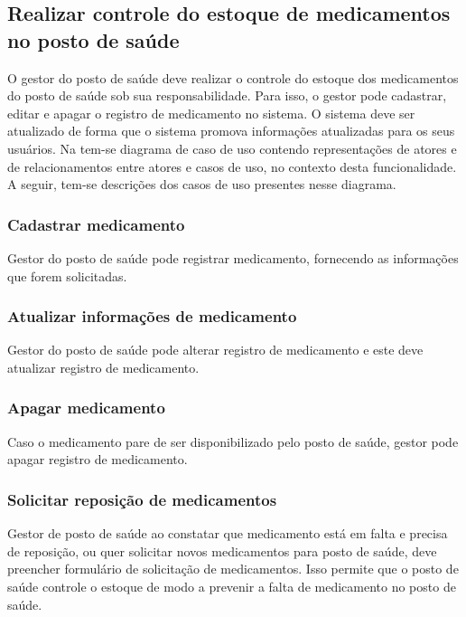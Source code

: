 %


\subsection{Realizar controle do estoque de medicamentos no posto de saúde}

O gestor do posto de saúde deve realizar o controle do estoque dos medicamentos do posto de saúde sob sua responsabilidade. Para isso, o gestor pode cadastrar, editar e apagar o registro de medicamento no sistema. O sistema deve ser atualizado de forma que o sistema promova informações atualizadas para os seus usuários. Na  tem-se diagrama de caso de uso contendo representações de atores e de relacionamentos entre atores e casos de uso, no contexto desta funcionalidade. A seguir, tem-se descrições dos casos de uso presentes nesse diagrama.


\subsubsection{Cadastrar medicamento}

Gestor do posto de saúde pode registrar medicamento, fornecendo as informações que forem solicitadas.

\subsubsection{Atualizar informações de medicamento}

Gestor do posto de saúde pode alterar registro de medicamento e este deve atualizar registro de medicamento. 

\subsubsection{Apagar medicamento}

Caso o medicamento pare de ser disponibilizado pelo posto de saúde, gestor pode apagar registro de medicamento.

\subsubsection{Solicitar reposição de medicamentos}
Gestor de posto de saúde ao constatar que medicamento está em falta e precisa de reposição, ou quer solicitar novos medicamentos para posto de saúde, deve preencher formulário de solicitação de medicamentos. Isso permite que o posto de saúde controle o estoque de modo a prevenir a falta de medicamento no posto de saúde.

